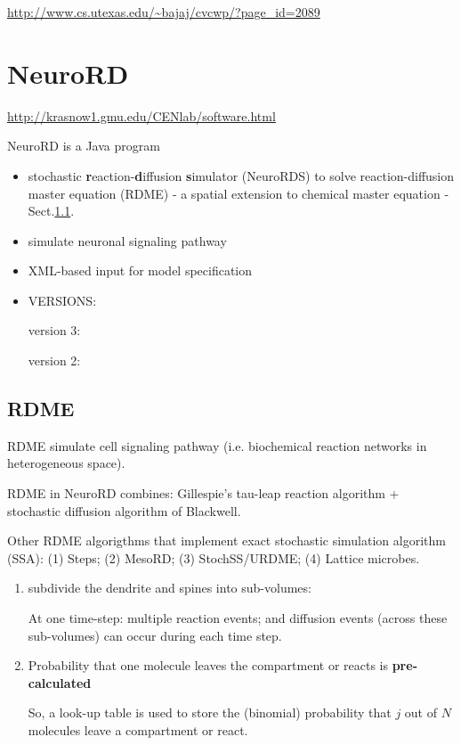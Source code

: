 \url{http://www.cs.utexas.edu/~bajaj/cvcwp/?page_id=2089}


\section{NeuroRD}
\label{sec:NeuroRD}

\url{http://krasnow1.gmu.edu/CENlab/software.html}


NeuroRD  is a Java program
\begin{itemize}
  \item stochastic {\bf r}eaction-{\bf d}iffusion {\bf s}imulator (NeuroRDS) to
  solve reaction-diffusion master equation (RDME) - a spatial extension to
  chemical master equation - Sect.\ref{sec:RDME}.
  
  
  \item simulate neuronal signaling pathway
  
  \item XML-based input for model specification
  
  \item VERSIONS: 
  
  version 3:
  
  version 2:
\end{itemize}

\subsection{RDME}
\label{sec:RDME}

  RDME simulate cell signaling pathway (i.e. biochemical reaction networks in
  heterogeneous space).

  RDME in NeuroRD combines: Gillespie's tau-leap reaction algorithm  +
  stochastic diffusion algorithm of Blackwell.
    
  Other RDME algorigthms that implement exact stochastic simulation algorithm
  (SSA): (1) Steps; (2) MesoRD; (3) StochSS/URDME; (4) Lattice microbes.


\begin{enumerate}
  \item subdivide the dendrite and spines into sub-volumes:
  
At one time-step: multiple reaction events; and diffusion events (across
these sub-volumes) can occur during each time step.
  
  \item Probability that one molecule leaves the compartment or reacts is {\bf
  pre-calculated}
  
So, a look-up table is used to store the (binomial) probability that $j$ out of
$N$ molecules leave a compartment or react.

\end{enumerate}

